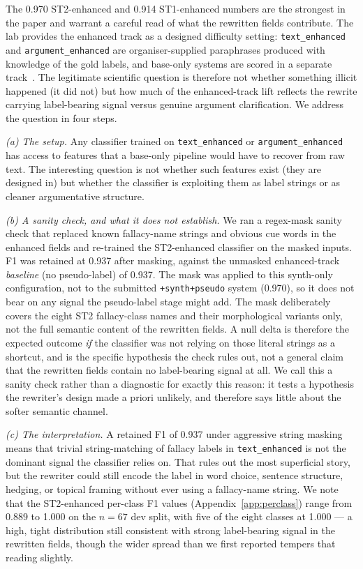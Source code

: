 The 0.970 ST2-enhanced and 0.914 ST1-enhanced numbers are the strongest in the paper and warrant a careful read of what the rewritten fields contribute. The lab provides the enhanced track as a designed difficulty setting: \texttt{text\_enhanced} and \texttt{argument\_enhanced} are organiser-supplied paraphrases produced with knowledge of the gold labels, and base-only systems are scored in a separate track~\cite{kiesel:2026c}. The legitimate scientific question is therefore not whether something illicit happened (it did not) but how much of the enhanced-track lift reflects the rewrite carrying label-bearing signal versus genuine argument clarification. We address the question in four steps. %

\emph{(a) The setup.} Any classifier trained on \texttt{text\_enhanced} or \texttt{argument\_enhanced} has access to features that a base-only pipeline would have to recover from raw text. The interesting question is not whether such features exist (they are designed in) but whether the classifier is exploiting them as label strings or as cleaner argumentative structure.

\emph{(b) A sanity check, and what it does not establish.} We ran a regex-mask sanity check that replaced known fallacy-name strings and obvious cue words in the enhanced fields and re-trained the ST2-enhanced classifier on the masked inputs. F1 was retained at 0.937 after masking, against the unmasked enhanced-track \emph{baseline} (no pseudo-label) of 0.937. The mask was applied to this synth-only configuration, not to the submitted \texttt{+synth+pseudo} system (0.970), so it does not bear on any signal the pseudo-label stage might add. %
The mask deliberately covers the eight ST2 fallacy-class names and their morphological variants only, not the full semantic content of the rewritten fields. A null delta is therefore the expected outcome \emph{if} the classifier was not relying on those literal strings as a shortcut, and is the specific hypothesis the check rules out, not a general claim that the rewritten fields contain no label-bearing signal at all. We call this a sanity check rather than a diagnostic for exactly this reason: it tests a hypothesis the rewriter's design made a priori unlikely, and therefore says little about the softer semantic channel.

\emph{(c) The interpretation.} A retained F1 of 0.937 under aggressive string masking means that trivial string-matching of fallacy labels in \texttt{text\_enhanced} is not the dominant signal the classifier relies on. That rules out the most superficial story, but the rewriter could still encode the label in word choice, sentence structure, hedging, or topical framing without ever using a fallacy-name string. We note that the ST2-enhanced per-class F1 values (Appendix~\ref{app:perclass}) range from 0.889 to 1.000 on the $n=67$ dev split, with five of the eight classes at 1.000 --- a high, tight distribution still consistent with strong label-bearing signal in the rewritten fields, though the wider spread than we first reported tempers that reading slightly. %

